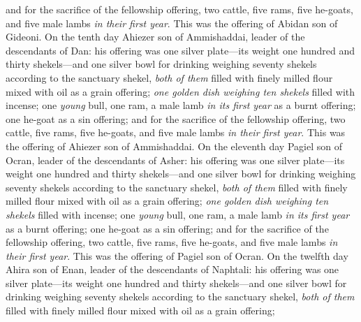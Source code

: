 \begin{biblechapter}
\verse and for the sacrifice of the fellowship offering, two cattle, five rams, five he-goats, and five male lambs \textit{in their first year}. This was the offering of Abidan son of Gideoni.
\verse On the tenth day Ahiezer son of Ammishaddai, leader of the descendants of Dan:
\verse his offering was one silver plate—its weight one hundred and thirty shekels—and one silver bowl for drinking weighing seventy shekels according to the sanctuary shekel, \textit{both of them} filled with finely milled flour mixed with oil as a grain offering;
\verse \textit{one golden dish weighing ten shekels} filled with incense;
\verse one \textit{young} bull, one ram, a male lamb \textit{in its first year} as a burnt offering;
\verse one he-goat as a sin offering;
\verse and for the sacrifice of the fellowship offering, two cattle, five rams, five he-goats, and five male lambs \textit{in their first year}. This was the offering of Ahiezer son of Ammishaddai.
\verse On the eleventh day Pagiel son of Ocran, leader of the descendants of Asher:
\verse his offering was one silver plate—its weight one hundred and thirty shekels—and one silver bowl for drinking weighing seventy shekels according to the sanctuary shekel, \textit{both of them} filled with finely milled flour mixed with oil as a grain offering;
\verse \textit{one golden dish weighing ten shekels} filled with incense;
\verse one \textit{young} bull, one ram, a male lamb \textit{in its first year} as a burnt offering;
\verse one he-goat as a sin offering;
\verse and for the sacrifice of the fellowship offering, two cattle, five rams, five he-goats, and five male lambs \textit{in their first year}. This was the offering of Pagiel son of Ocran.
\verse On the twelfth day Ahira son of Enan, leader of the descendants of Naphtali:
\verse his offering was one silver plate—its weight one hundred and thirty shekels—and one silver bowl for drinking weighing seventy shekels according to the sanctuary shekel, \textit{both of them} filled with finely milled flour mixed with oil as a grain offering;

\end{biblechapter}
